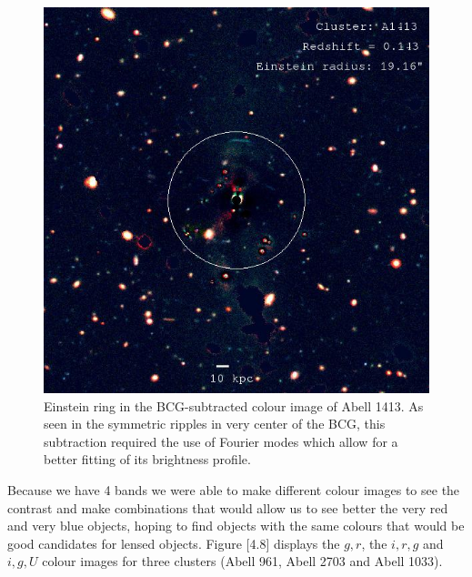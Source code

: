 \begin{figure}[H]
\centering
\includegraphics[width=15cm]{images/A1413_ring.jpg}
\caption[Einstein ring in colour image of A1413]{Einstein ring in the BCG-subtracted colour image of Abell 1413. As seen in the symmetric ripples in very center of the BCG, this subtraction required the use of Fourier modes which allow for a better fitting of its brightness profile.}
\end{figure}

Because we have 4 bands we were able to make different colour images to see the contrast and make combinations that would allow us to see better the very red and very blue objects, hoping to find objects with the same colours that would be good candidates for lensed objects. Figure [4.8] displays the $g,r$, the $i,r,g$ and $i,g,U$ colour images for three clusters (Abell 961, Abell 2703 and Abell 1033). 

